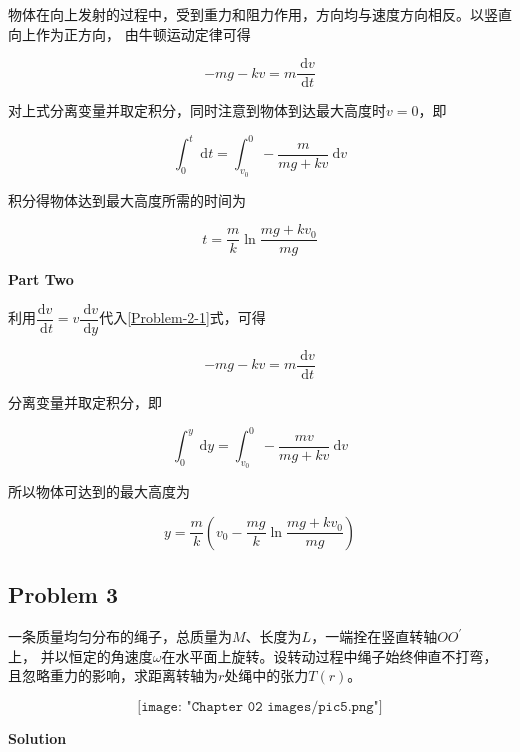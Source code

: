 \documentclass[
	12pt, %
	a4paper, %
]{myLegrandOrangeBook}
\begin{document}
    物体在向上发射的过程中，受到重力和阻力作用，方向均与速度方向相反。以竖直向上作为正方向，
    由牛顿运动定律可得

    \begin{equation}
        -m g-k v=m \frac{\mathrm{~d} v}{\mathrm{~d} t}
        \label{Problem-2-1}
    \end{equation}

    对上式分离变量并取定积分，同时注意到物体到达最大高度时\(v=0\)，即

    $$
        \int_0^t \mathrm{~d} t=\int_{v_0}^0-\frac{m}{m g+k v} \mathrm{~d} v
    $$

    积分得物体达到最大高度所需的时间为

    $$
        t=\frac{m}{k} \ln \frac{m g+k v_0}{m g}
    $$

    \textbf{Part Two}
    \vspace{1em}

    利用$\dfrac{\mathrm{d} v}{\mathrm{~d} t}=v \dfrac{\mathrm{~d} v}{\mathrm{~d} y}$代入\ref{Problem-2-1}式，可得

    $$
        -m g-k v=m \frac{\mathrm{~d} v}{\mathrm{~d} t}
    $$

    分离变量并取定积分，即

    $$
        \int_0^y \mathrm{~d} y=\int_{v_0}^0-\frac{m v}{m g+k v} \mathrm{~d} v
    $$

    所以物体可达到的最大高度为

    $$
        y=\frac{m}{k}\left(v_0-\frac{m g}{k} \ln \frac{m g+k v_0}{m g}\right)
    $$

\subsection{Problem 3}

    \begin{exercise}

        一条质量均匀分布的绳子，总质量为\(M\)、长度为\(L\)，一端拴在竖直转轴\(OO^{'}\)\\上，
        并以恒定的角速度\(\omega\)在水平面上旋转。设转动过程中绳子始终伸直不打弯，
        且忽略重力的影响，求距离转轴为\(r\)处绳中的张力\(T\left(r\right)\)。

        \[
            \texttt{[image: "Chapter 02 images/pic5.png"]}
            \label{pic5}
        \]

    \end{exercise}

    \textbf{Solution}
    \vspace{1em}
\end{document}
